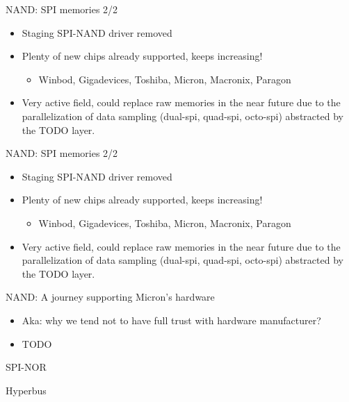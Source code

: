 \documentclass[aspectratio=169,obeyspaces,spaces,hyphens,dvipsnames]{beamer}
\begin{document}
\begin{frame}{NAND: SPI memories 2/2}
  \begin{itemize}
  \item Staging SPI-NAND driver removed
  \item Plenty of new chips already supported, keeps increasing!
    \begin{itemize}
    \item Winbod, Gigadevices, Toshiba, Micron, Macronix, Paragon
    \end{itemize}
  \item Very active field, could replace raw memories in the near future
    due to the parallelization of data sampling (dual-spi, quad-spi,
    octo-spi) abstracted by the TODO layer.
  \end{itemize}
\end{frame}

\begin{frame}{NAND: SPI memories 2/2}
  \begin{itemize}
  \item Staging SPI-NAND driver removed
  \item Plenty of new chips already supported, keeps increasing!
    \begin{itemize}
    \item Winbod, Gigadevices, Toshiba, Micron, Macronix, Paragon
    \end{itemize}
  \item Very active field, could replace raw memories in the near future
    due to the parallelization of data sampling (dual-spi, quad-spi,
    octo-spi) abstracted by the TODO layer.
  \end{itemize}
\end{frame}

\begin{frame}{NAND: A journey supporting Micron's hardware}
  \begin{itemize}
  \item Aka: why we tend not to have full trust with hardware
    manufacturer?
  \item TODO
  \end{itemize}
\end{frame}

\begin{frame}{SPI-NOR}
\end{frame}

\begin{frame}{Hyperbus}
\end{frame}
\end{document}
